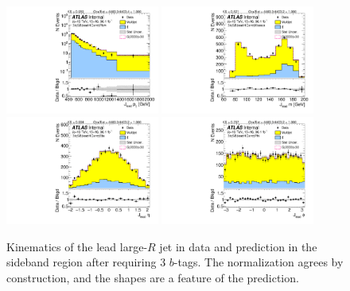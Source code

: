 \clearpage

\begin{figure}[htbp!]
\begin{center}
\includegraphics[width=0.45\textwidth,angle=-90]{figures/boosted/Sideband/b77_ThreeTag_Sideband_leadHCand_Pt_m_1.pdf}
\includegraphics[width=0.45\textwidth,angle=-90]{figures/boosted/Sideband/b77_ThreeTag_Sideband_leadHCand_Mass_s.pdf}\\
\includegraphics[width=0.45\textwidth,angle=-90]{figures/boosted/Sideband/b77_ThreeTag_Sideband_leadHCand_Eta.pdf}
\includegraphics[width=0.45\textwidth,angle=-90]{figures/boosted/Sideband/b77_ThreeTag_Sideband_leadHCand_Phi.pdf}
  \caption{Kinematics of the lead large-$R$ jet in data and prediction in the sideband region after requiring 3 $b$-tags. The normalization agrees by construction, and the shapes are a feature of the prediction.}
  \label{fig:boosted-3b-sideband-ak10-lead}
\end{center}
\end{figure}

